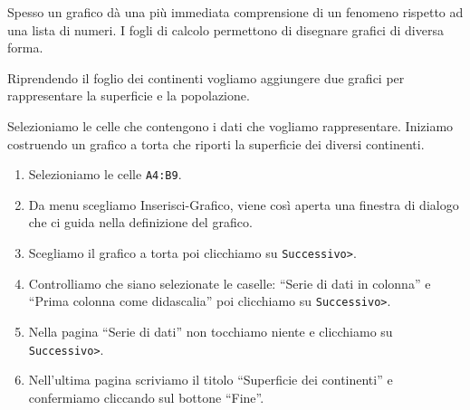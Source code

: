 Spesso un grafico dà una più immediata comprensione di un fenomeno rispetto
ad una lista di numeri.
I fogli di calcolo permettono di disegnare grafici di diversa forma.

Riprendendo il foglio dei continenti vogliamo aggiungere due grafici per
rappresentare la superficie e la popolazione.

Selezioniamo le celle che
contengono i dati che vogliamo rappresentare.
Iniziamo costruendo un grafico a torta che riporti la superficie dei
diversi continenti.

\begin{enumerate} [noitemsep]
\item Selezioniamo le celle \texttt{A4:B9}.
\item Da menu scegliamo Inserisci-Grafico, viene così aperta una finestra
di dialogo che ci guida nella definizione del grafico.
\item Scegliamo il grafico a torta
poi clicchiamo su \texttt{Successivo>}.
\item Controlliamo che siano selezionate le caselle:
``Serie di dati in colonna'' e ``Prima colonna come didascalia''
poi clicchiamo su \texttt{Successivo>}.
\item Nella pagina ``Serie di dati'' non tocchiamo niente 
e clicchiamo su \texttt{Successivo>}.
\item Nell'ultima pagina scriviamo il titolo  ``Superficie dei continenti''
e confermiamo cliccando sul bottone ``Fine''.
\end{enumerate}


